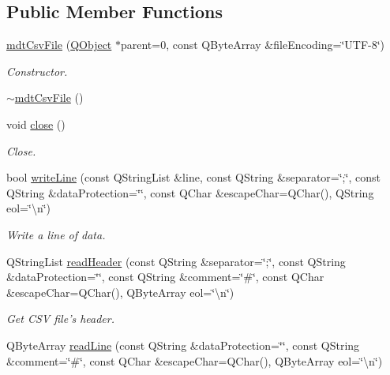 \subsection*{Public Member Functions}
\begin{DoxyCompactItemize}
\item 
\hyperlink{classmdt_csv_file_aaca142b18a4f436548e17fbef755e2d5}{mdt\-Csv\-File} (\hyperlink{class_q_object}{Q\-Object} $\ast$parent=0, const Q\-Byte\-Array \&file\-Encoding=\char`\"{}U\-T\-F-\/8\char`\"{})
\begin{DoxyCompactList}\small\item\em Constructor. \end{DoxyCompactList}\item 
\hyperlink{classmdt_csv_file_aea6a3fe22d2561b2dad65ed856e3d348}{$\sim$mdt\-Csv\-File} ()
\item 
void \hyperlink{classmdt_csv_file_abfe09c325401ac9ca39c9d2329d6bc9c}{close} ()
\begin{DoxyCompactList}\small\item\em Close. \end{DoxyCompactList}\item 
bool \hyperlink{classmdt_csv_file_a0e85f46ffdc4e44c8974c485abcc48b8}{write\-Line} (const Q\-String\-List \&line, const Q\-String \&separator=\char`\"{};\char`\"{}, const Q\-String \&data\-Protection=\char`\"{}\char`\"{}, const Q\-Char \&escape\-Char=Q\-Char(), Q\-String eol=\char`\"{}\textbackslash{}n\char`\"{})
\begin{DoxyCompactList}\small\item\em Write a line of data. \end{DoxyCompactList}\item 
Q\-String\-List \hyperlink{classmdt_csv_file_a4010d76497d8f5d2a85171025d31f100}{read\-Header} (const Q\-String \&separator=\char`\"{};\char`\"{}, const Q\-String \&data\-Protection=\char`\"{}\char`\"{}, const Q\-String \&comment=\char`\"{}\#\char`\"{}, const Q\-Char \&escape\-Char=Q\-Char(), Q\-Byte\-Array eol=\char`\"{}\textbackslash{}n\char`\"{})
\begin{DoxyCompactList}\small\item\em Get C\-S\-V file's header. \end{DoxyCompactList}\item 
Q\-Byte\-Array \hyperlink{classmdt_csv_file_aa7d5e7ab9d6d71f7ca1c9fe7bea043a3}{read\-Line} (const Q\-String \&data\-Protection=\char`\"{}\char`\"{}, const Q\-String \&comment=\char`\"{}\#\char`\"{}, const Q\-Char \&escape\-Char=Q\-Char(), Q\-Byte\-Array eol=\char`\"{}\textbackslash{}n\char`\"{})

\end{DoxyCompactItemize}
